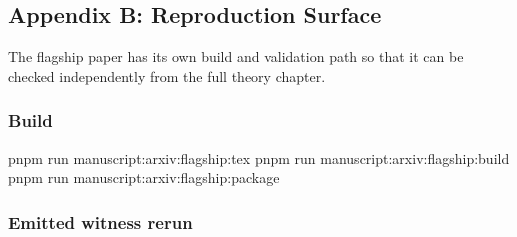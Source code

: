 \documentclass[
  11pt,
]{article}
\newenvironment{Shaded}{}{}
\newcommand{\ExtensionTok}[1]{#1}
\newcommand{\NormalTok}[1]{#1}
\begin{document}
\subsection{Appendix B: Reproduction
Surface}\label{appendix-b-reproduction-surface}

The flagship paper has its own build and validation path so that it can
be checked independently from the full theory chapter.

\subsubsection{Build}\label{build}

\begin{Shaded}
\begin{Highlighting}[]
\ExtensionTok{pnpm}\NormalTok{ run manuscript:arxiv:flagship:tex}
\ExtensionTok{pnpm}\NormalTok{ run manuscript:arxiv:flagship:build}
\ExtensionTok{pnpm}\NormalTok{ run manuscript:arxiv:flagship:package}
\end{Highlighting}
\end{Shaded}

\subsubsection{Emitted witness rerun}\label{emitted-witness-rerun}
\end{document}
